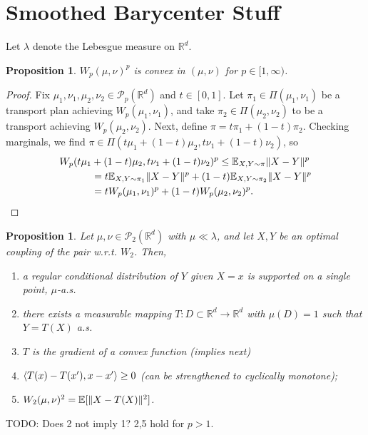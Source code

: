 \documentclass{article}
\newtheorem{proposition}[theorem]{Proposition}
\newcommand{\R}{\mathbb{R}}
\newcommand{\E}{\mathbb{E}}
\renewcommand{\P}{\mathcal{P}}
\DeclarePairedDelimiter{\norm}{\lVert}{\rVert}
\DeclarePairedDelimiter{\inner}{\langle}{\rangle}
\begin{document}
\section{Smoothed Barycenter Stuff}

Let $\lambda$ denote the Lebesgue measure on $\R^d$.

\begin{proposition}
    $W_p(\mu,\nu)^p$ is convex in $(\mu,\nu)$ for $p \in [1,\infty)$.
\end{proposition}
\begin{proof}
    Fix $\mu_1,\nu_1, \mu_2,\nu_2 \in \P_p(\R^d)$ and $t \in [0,1]$.
    Let $\pi_1 \in \Pi(\mu_1,\nu_1)$ be a transport plan achieving $W_p(\mu_1,\nu_1)$, and take $\pi_2 \in \Pi(\mu_2,\nu_2)$ to be a transport achieving $W_p(\mu_2,\nu_2)$. Next, define $\pi = t \pi_1 + (1 - t) \pi_2$. Checking marginals, we find $\pi \in \Pi(t \mu_1 + (1 - t)\mu_2, t \nu_1 + (1 - t)\nu_2)$, so
    \begin{align*}
        W_p(t \mu_1 &+ (1 - t)\mu_2,t \nu_1 + (1 - t)\nu_2)^p \leq \E_{X,Y \sim \pi}\norm{X - Y}^p \\
        &= t \E_{X,Y \sim \pi_1}\norm{X - Y}^p + (1 - t) \E_{X,Y \sim \pi_2}\norm{X - Y}^p \\
        &= t W_p(\mu_1,\nu_1)^p + (1 - t) W_p(\mu_2,\nu_2)^p.
    \end{align*}
\end{proof}

\begin{proposition}
    Let $\mu,\nu \in \P_2(\R^d)$ with $\mu \ll \lambda$, and let $X,Y$ be an optimal coupling of the pair w.r.t. $W_2$. Then, 
    \begin{enumerate}
        \item a regular conditional distribution of $Y$ given $X = x$ is supported on a single point, $\mu$-a.s.
        \item there exists a measurable mapping $T:D \subset \R^d \to \R^d$ with $\mu(D) = 1$ such that $Y = T(X)$ a.s.
        \item $T$ is the gradient of a convex function (implies next)
        \item $\inner{T(x) - T(x'), x - x'} \geq 0$ (can be strengthened to cyclically monotone);
        \item $W_2(\mu,\nu)^2 = \E[\norm{X - T(X)}^2]$.
    \end{enumerate}
\end{proposition}

TODO: Does 2 not imply 1? 2,5 hold for $p > 1$.
\end{document}
